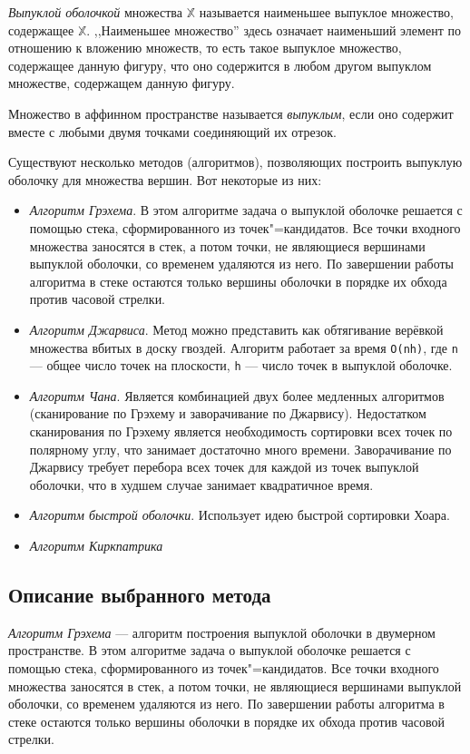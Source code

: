 \documentclass[a4paper,12pt,notitlepage,headsepline,pdftex]{scrartcl}
\begin{document}
  \emph{Выпуклой оболочкой} множества $\mathbb{X}$ называется наименьшее
  выпуклое множество, содержащее $\mathbb{X}$.
  ,,Наименьшее множество'' здесь означает наименьший элемент по отношению к
  вложению множеств, то есть такое выпуклое множество, содержащее данную
  фигуру, что оно содержится в любом другом выпуклом множестве, содержащем
  данную фигуру.\cite{book2}

  Множество в аффинном пространстве называется \emph{выпуклым}, если оно
  содержит вместе с любыми двумя точками соединяющий их отрезок.

  Существуют несколько методов (алгоритмов), позволяющих построить выпуклую
  оболочку для множества вершин.
  Вот некоторые из них:
  \begin{itemize}
    \item \emph{Алгоритм Грэхема}.
      В этом алгоритме задача о выпуклой оболочке решается с помощью стека,
      сформированного из точек"=кандидатов.
      Все точки входного множества заносятся в стек, а потом точки, не
      являющиеся вершинами выпуклой оболочки, со временем удаляются из него.
      По завершении работы алгоритма в стеке остаются только вершины оболочки
      в порядке их обхода против часовой стрелки.\cite{book3}
    \item \emph{Алгоритм Джарвиса}.
      Метод можно представить как обтягивание верёвкой множества вбитых в
      доску гвоздей.
      Алгоритм работает за время \verb'O(nh)', где \verb'n' --- общее число
      точек на плоскости, \verb'h' --- число точек в выпуклой
      оболочке.\cite{book4}
    \item \emph{Алгоритм Чана}.
      Является комбинацией двух более медленных алгоритмов (сканирование по
      Грэхему  и заворачивание по Джарвису).
      Недостатком сканирования по Грэхему является необходимость сортировки
      всех точек по полярному углу, что занимает достаточно много времени.
      Заворачивание по Джарвису требует перебора всех точек для каждой из
      точек выпуклой оболочки, что в худшем случае занимает квадратичное
      время.\cite{book5}
    \item \emph{Алгоритм быстрой оболочки}.
      Использует идею быстрой сортировки Хоара.
    \item \emph{Алгоритм Киркпатрика}
  \end{itemize}
  \subsection{Описание выбранного метода}
    \emph{Алгоритм Грэхема} --- алгоритм построения выпуклой оболочки в
    двумерном пространстве.
    В этом алгоритме задача о выпуклой оболочке решается с помощью стека,
    сформированного из точек"=кандидатов.
    Все точки входного множества заносятся в стек, а потом точки, не
    являющиеся вершинами выпуклой оболочки, со временем удаляются из него.
    По завершении работы алгоритма в стеке остаются только вершины оболочки в
    порядке их обхода против часовой стрелки.
\end{document}
